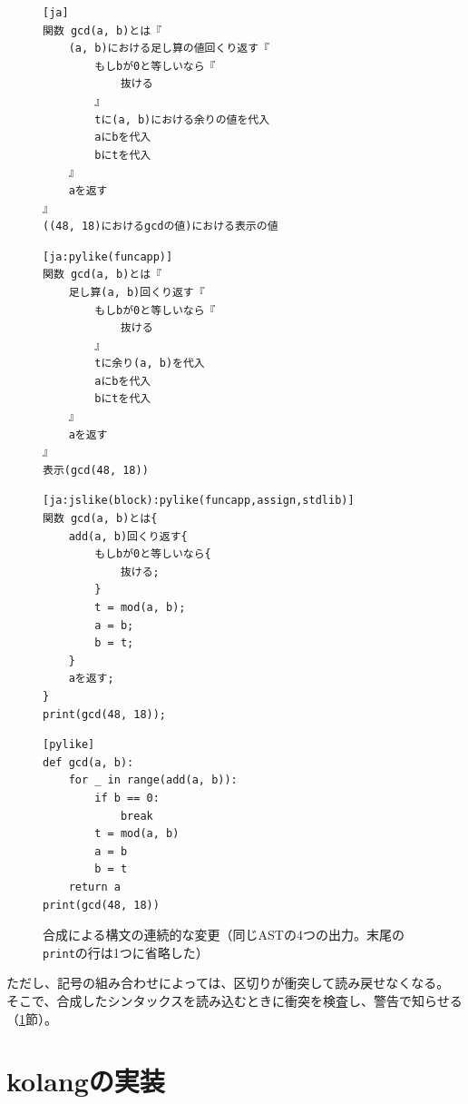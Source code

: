 \documentclass{ipsjprosym}
\begin{document}
\begin{figure}[t]
\footnotesize
\begin{minipage}[t]{0.48\textwidth}
\begin{verbatim}
[ja]
関数 gcd(a, b)とは『
    (a, b)における足し算の値回くり返す『
        もしbが0と等しいなら『
            抜ける
        』
        tに(a, b)における余りの値を代入
        aにbを代入
        bにtを代入
    』
    aを返す
』
((48, 18)におけるgcdの値)における表示の値
\end{verbatim}
\end{minipage}
\hfill
\begin{minipage}[t]{0.48\textwidth}
\begin{verbatim}
[ja:pylike(funcapp)]
関数 gcd(a, b)とは『
    足し算(a, b)回くり返す『
        もしbが0と等しいなら『
            抜ける
        』
        tに余り(a, b)を代入
        aにbを代入
        bにtを代入
    』
    aを返す
』
表示(gcd(48, 18))
\end{verbatim}
\end{minipage}

\medskip
\begin{minipage}[t]{0.48\textwidth}
\begin{verbatim}
[ja:jslike(block):pylike(funcapp,assign,stdlib)]
関数 gcd(a, b)とは{
    add(a, b)回くり返す{
        もしbが0と等しいなら{
            抜ける;
        }
        t = mod(a, b);
        a = b;
        b = t;
    }
    aを返す;
}
print(gcd(48, 18));
\end{verbatim}
\end{minipage}
\hfill
\begin{minipage}[t]{0.48\textwidth}
\begin{verbatim}
[pylike]
def gcd(a, b):
    for _ in range(add(a, b)):
        if b == 0:
            break
        t = mod(a, b)
        a = b
        b = t
    return a
print(gcd(48, 18))
\end{verbatim}
\end{minipage}
\caption{合成による構文の連続的な変更（同じASTの4つの出力。末尾の\texttt{print}の行は1つに省略した）}
\label{fig:cascade}
\end{figure}

ただし、記号の組み合わせによっては、区切りが衝突して読み戻せなくなる。
そこで、合成したシンタックスを読み込むときに衝突を検査し、警告で知らせる（\ref{sec:impl}節）。

\section{kolangの実装}
\label{sec:impl}
\end{document}
